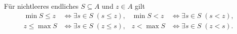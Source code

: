\begin{theorem}
\label{b15guide:thm:finite-or}
Für nichtleeres endliches $S\subseteq A$ und $z\in A$ gilt
\[
\begin{aligned}
 \min S\leq z&\Longleftrightarrow\exists s\in S\;(s\leq z),&
 \min S<z&\Longleftrightarrow\exists s\in S\;(s<z),\\
 z\leq\max S&\Longleftrightarrow\exists s\in S\;(z\leq s),&
 z<\max S&\Longleftrightarrow\exists s\in S\;(z<s).
\end{aligned}
\]
\end{theorem}

